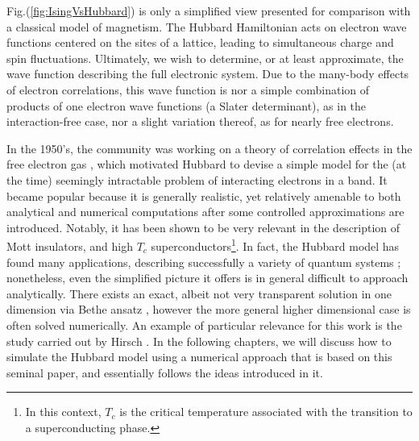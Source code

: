 Fig.(\ref{fig:IsingVsHubbard}) is only a simplified view presented for comparison with a classical model of magnetism.
The Hubbard Hamiltonian acts on electron wave functions centered on the sites of a lattice, leading to simultaneous charge and spin fluctuations. 
Ultimately, we wish to determine, or at least approximate, the wave function describing the full electronic system. 
Due to the many-body effects of electron correlations, this wave function is nor a simple combination of products of one electron wave functions (a Slater determinant), as in the interaction-free case, nor a slight variation thereof, as for nearly free electrons.

In the 1950's, the community was working on a theory of correlation effects in the free electron gas \cite{bohm_collective_1953, gell-mann_correlation_1957, sawada_correlation_1957, hubbard_description_1958, hubbard_description_1958_2, nozieres_electron_1958}, which motivated Hubbard to devise a simple model for the (at the time) seemingly intractable problem of interacting electrons in a band.
It became popular because it is generally realistic, yet relatively amenable to both analytical and numerical computations after some controlled approximations are introduced.
Notably, it has been shown to be very relevant in the description of Mott insulators, and high $T_c$  superconductors\footnote{In this context, $T_c$ is the critical temperature associated with the transition to a superconducting phase.}.
In fact, the Hubbard model has found many applications, describing successfully a variety of quantum systems \cite{editorial_hubbard_2013}; nonetheless, even the simplified picture it offers is in general difficult to approach analytically.
There exists an exact, albeit not very transparent solution in one dimension via Bethe ansatz \cite{lieb_absence_1968}, however the more general higher dimensional case is often solved numerically.
An example of particular relevance for this work is the study carried out by Hirsch \cite{hirsch_two-dimensional_1985}.
In the following chapters, we will discuss how to simulate the Hubbard model using a numerical approach that is based on this seminal paper, and essentially follows the ideas introduced in it.